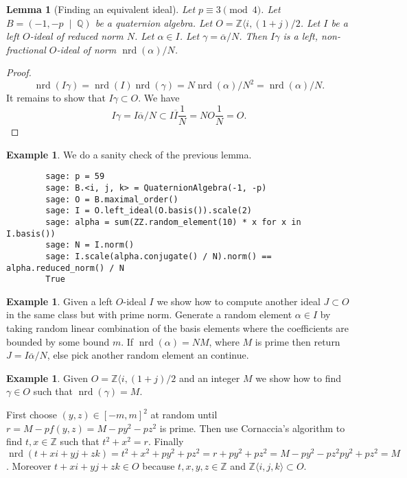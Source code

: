 \documentclass[10pt]{article}
\theoremstyle{plain}
\newtheorem{lemma}[theorem]{Lemma}
\theoremstyle{definition}
\newtheorem{example}[theorem]{Example}
\newcommand{\op}{\operatorname}
\newcommand{\Z}{\mathbb{Z}}
\newcommand{\Q}{\mathbb{Q}}
\newcommand{\nrd}{\op{nrd}}
\begin{document}
\begin{lemma}[Finding an equivalent ideal]
    Let \( p \equiv 3 \pmod{4} \).
    Let \( B =  (-1, -p \; \mid \; \Q) \) be a quaternion algebra.
    Let \( O = \Z \langle i, (1+j) / 2 \).
    Let \( I \) be a left \( O \)-ideal of reduced norm \( N \).
    Let \( \alpha \in I \).
    Let \( \gamma = \overline{\alpha} / N \).
    Then \( I \gamma \) is a left, non-fractional \( O \)-ideal of norm \( \nrd(\alpha) / N \).
\end{lemma}
\begin{proof}
    \[
        \nrd(I \gamma) = \nrd(I)\nrd(\gamma) = N \nrd(\alpha) / N^2 = \nrd(\alpha) / N.
    \]
    It remains to show that \( I\gamma \subset O \).
    We have
    \[
        I\gamma = I\overline{\alpha} / N \subset I\overline{I} \frac{1}{N} = NO \frac{1}{N} = O.
    \]
\end{proof}

\begin{example}
    We do a sanity check of the previous lemma.
    \begin{lstlisting}
        sage: p = 59
        sage: B.<i, j, k> = QuaternionAlgebra(-1, -p)
        sage: O = B.maximal_order()
        sage: I = O.left_ideal(O.basis()).scale(2)
        sage: alpha = sum(ZZ.random_element(10) * x for x in I.basis())
        sage: N = I.norm()
        sage: I.scale(alpha.conjugate() / N).norm() == alpha.reduced_norm() / N
        True
    \end{lstlisting}
\end{example}

\begin{example}
    Given a left \( O \)-ideal \( I \) we show how to compute another ideal \( J \subset O \) in the same class but with prime norm.
    Generate a random element \( \alpha \in I \) by taking random linear combination of the basis elements where the coefficients are bounded by some bound \( m \).
    If \( \nrd(\alpha) = NM \), where \( M \) is prime then return \( J = I \overline{\alpha} / N \), else pick another random element an continue.
\end{example}


\begin{example}
    Given \( O = \Z \langle i, (1+j) / 2 \) and an integer \( M \) we show how to find \( \gamma \in O \) such that \( \nrd(\gamma) = M \).

    First choose \( (y, z) \in [-m , m]^2 \) at random until \( r = M - pf(y, z) = M - py^2 - pz^2\) is prime.
    Then use Cornaccia's algorithm to find \( t, x \in \Z \) such that \(  t^2 + x^2 = r.\)
    Finally \( \nrd(t + xi + yj + zk) = t^2 + x^2 + py^2 + pz^2 = r + py^2 + pz^2 = M - py^2 - pz^2 py^2 + pz^2 = M\).
    Moreover \( t + xi + yj + zk \in O \) because \( t, x, y, z \in \Z \) and \( \Z \langle i ,j, k \rangle \subset O \).
\end{example}
\end{document}
